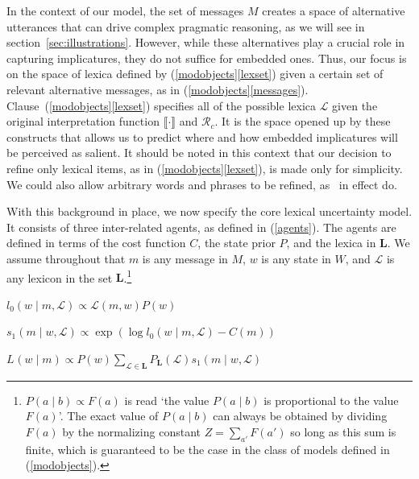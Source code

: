 \documentclass[leqno,12pt]{article}
\newcommand{\CFS}{\citetalias{ChierchiaFoxSpector08}}
\newcommand{\secref}[1]{section~\ref{#1}}
\newcommand{\eg}[1]{(\ref{#1})}
\newcommand{\subeg}[2]{(\ref{#1}\ref{#2})}
\newcommand{\given}{\mid}
\newcommand{\sem}[1]{\ensuremath{\llbracket#1\rrbracket}}
\newcommand{\States}{W}
\newcommand{\state}{w}
\newcommand{\Lex}{\mathcal{L}}
\newcommand{\LexSet}{\mathbf{L}}
\newcommand{\Messages}{M}
\newcommand{\msg}{m}
\newcommand{\Costs}{C}
\newcommand{\StatePrior}{P}
\newcommand{\LexPrior}{P_{\LexSet}}
\newcommand{\listenerZero}{l_{0}}
\newcommand{\speakerOne}{s_{1}}
\newcommand{\UncertaintyListener}[1][]{L_{#1}}
\newcommand{\Refine}[1][c]{\mathcal{R}_{#1}}
\begin{document}
{In the context of our model, the set of messages $\Messages$ creates a
space of alternative utterances that can drive complex pragmatic
reasoning, as we will see in \secref{sec:illustrations}.  However,
while these alternatives play a crucial role in capturing
implicatures, they do not suffice for embedded ones. Thus, our focus
is on the space of lexica defined by \subeg{modobjects}{lexset} given
a certain set of relevant alternative messages, as in
\subeg{modobjects}{messages}. Clause~\subeg{modobjects}{lexset}
specifies all of the possible lexica $\Lex$ given the original
interpretation function $\sem{\cdot}$ and $\Refine$.  It is the space
opened up by these constructs that allows us to predict where and how
embedded implicatures will be perceived as salient.  It should be
noted in this context that our decision to refine only lexical items,
as in \subeg{modobjects}{lexset}, is made only for simplicity. We
could also allow arbitrary words and phrases to be refined, as \CFS\
in effect do.

With this background in place, we now specify the core lexical
uncertainty model. It consists of three inter-related agents, as
defined in \eg{agents}. The agents are defined in terms of the cost
function $\Costs$, the state prior $\StatePrior$, and the lexica in
$\LexSet$.  We assume throughout that $\msg$ is any message in
$\Messages$, $\state$ is any state in $\States$, and $\Lex$ is any
lexicon in the set $\LexSet$.\footnote{$P(a \given b) \propto F(a)$ is
  read `the value $P(a \given b)$ is proportional to the value
  $F(a)$'. The exact value of $P(a \given b)$ can always be obtained by
  dividing $F(a)$ by the normalizing constant $Z=\sum_{a'} F(a')$ so
  long as this sum is finite, which is guaranteed to be the case in
  the class of models defined in \eg{modobjects}.}
%
\begin{examples}
\item\label{agents}
  \begin{examples}

  \item\label{l0}%
    $\listenerZero(\state \given \msg, \Lex) \propto \Lex(\msg, \state)\StatePrior(\state)$

  \item\label{s1}%
    $\speakerOne(\msg \given \state, \Lex) \propto
    \exp
    \left(
      \log\listenerZero(\state \given \msg, \Lex)
      - 
      \Costs(\msg)
    \right)$
    
  \item\label{L} 
    $\UncertaintyListener(\state \given \msg) 
    \propto 
    \StatePrior(\state)
    \sum_{\Lex \in \LexSet}
    \LexPrior(\Lex)
    \speakerOne(\msg \given \state, \Lex)$
  \end{examples}
\end{examples}

}
\end{document}
